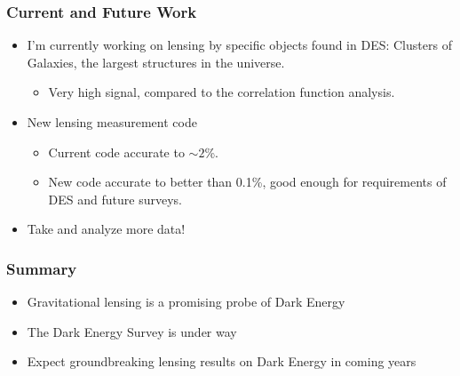 \documentclass{beamer}
\begin{document}
\frame
{

    \frametitle{Current and Future Work}
 
 
    \begin{itemize}


        \item I'm currently working on lensing by specific objects found in
            DES: {\color{gold} Clusters of Galaxies}, the largest structures in the universe.

        \begin{itemize}
            \item Very high signal, compared to the correlation function analysis.
        \end{itemize}

        \item New lensing measurement code
        \begin{itemize}
            \item Current code accurate to $\sim 2$\%.
            \item New code accurate to better than {\color{gold} 0.1\%}, good enough for
                requirements of DES and future surveys.
        \end{itemize}

        \item Take and analyze more data!

    \end{itemize}

}




\frame
{

    \frametitle{Summary}
 
 
    \begin{itemize}

        \item Gravitational lensing is a promising probe of Dark Energy

        \item The Dark Energy Survey is under way

        \item Expect groundbreaking lensing results on Dark Energy in coming years

    \end{itemize}

}
\end{document}
